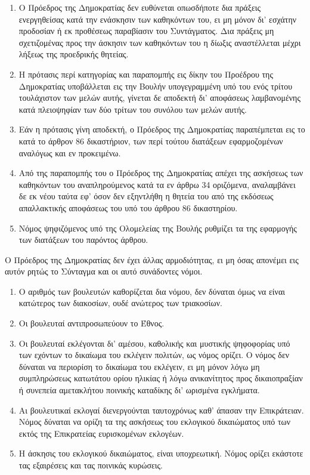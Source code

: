 \documentclass[twoside, a4paper, 10pt]{article}
\begin{document}
\begin{multicols}{2}
\begin{enumerate}
\begin{BigQuote}
\begin{enumerate}
  \item[1.] Ο Πρόεδρος της Δημοκρατίας δεν ευθύνεται οπωσδήποτε δια πράξεις ενεργηθείσας κατά την ενάσκησιν των καθηκόντων του, ει μη μόνον δι' εσχάτην προδοσίαν ή εκ προθέσεως παραβίασιν του Συντάγματος. Δια πράξεις μη σχετιζομένας  προς την άσκησιν των καθηκόντων του η δίωξις αναστέλλεται μέχρι λήξεως της προεδρικής θητείας.
  \item[2.] Η πρότασις περί κατηγορίας και παραπομπής εις δίκην του Προέδρου της Δημοκρατίας υποβάλλεται εις την Βουλήν υπογεγραμμένη υπό του ενός τρίτου τουλάχιστον των μελών αυτής, γίνεται δε αποδεκτή δι' αποφάσεως λαμβανομένης κατά πλειοψηφίαν των δύο τρίτων του συνόλου των μελών αυτής.
  \item[3.] Εάν η πρότασις γίνη αποδεκτή, ο Πρόεδρος της Δημοκρατίας παραπέμπεται εις το κατά το άρθρον 86 δικαστήριον, των περί τούτου διατάξεων εφαρμοζομένων αναλόγως και εν προκειμένω.
  \item[4.] Από της παραπομπής του ο Πρόεδρος της Δημοκρατίας απέχει της ασκήσεως των καθηκόντων του αναπληρούμενος κατά τα εν άρθρω 34 οριζόμενα, αναλαμβάνει δε εκ νέου ταύτα εφ' όσον δεν εξηντλήθη η θητεία του από της εκδόσεως απαλλακτικής αποφάσεως του υπό του άρθρου 86 δικαστηρίου.
  \item[5.] Νόμος ψηφιζόμενος υπό της Ολομελείας της Βουλής ρυθμίζει τα της εφαρμογής των διατάξεων του παρόντος άρθρου.
\end{enumerate}

Ο Πρόεδρος της Δημοκρατίας δεν έχει άλλας αρμοδιότητας, ει μη όσας απονέμει εις αυτόν ρητώς το Σύνταγμα και οι αυτό συνάδοντες νόμοι.

\begin{enumerate}
  \item[1.] Ο αριθμός των βουλευτών καθορίζεται δια νόμου, δεν δύναται όμως να είναι κατώτερος των διακοσίων, ουδέ ανώτερος των τριακοσίων.
  \item[2.] Οι βουλευταί αντιπροσωπεύουν το Έθνος.
  \item[3.] Οι βουλευταί εκλέγονται δι' αμέσου, καθολικής και μυστικής ψηφοφορίας υπό των εχόντων το δικαίωμα του εκλέγειν πολιτών, ως νόμος ορίζει. Ο νόμος δεν δύναται να περιορίση το δικαίωμα του εκλέγειν, ει μη μόνον λόγω μη συμπληρώσεως κατωτάτου ορίου ηλικίας ή λόγω ανικανίτητος προς δικαιοπραξίαν ή συνεπεία αμετακλήτου ποινικής καταδίκης δι' ωρισμένα εγκλήματα.
  \item[4.] Αι βουλευτικαί εκλογαί διενεργούνται ταυτοχρόνως καθ' άπασαν την Επικράτειαν.
Νόμος δύναται να ορίζη τα της ασκήσεως του εκλογικού δικαιώματος υπό των εκτός της Επικρατείας ευρισκομένων εκλογέων.
  \item[5.] Η άσκησις του εκλογικού δικαιώματος, είναι υποχρεωτική. Νόμος ορίζει εκάστοτε τας εξαιρέσεις και τας ποινικάς κυρώσεις.
\end{enumerate}


\end{BigQuote}
\end{enumerate}
\end{multicols}
\end{document}
